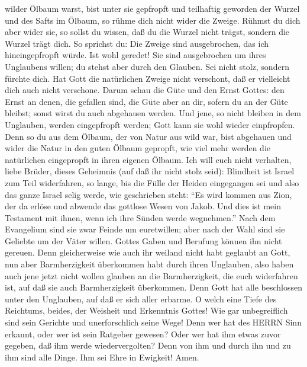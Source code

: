 wilder Ölbaum warst, bist unter sie gepfropft und teilhaftig geworden
der Wurzel und des Safts im Ölbaum,  so rühme dich nicht
wider die Zweige. Rühmst du dich aber wider sie, so sollst du wissen,
daß du die Wurzel nicht trägst, sondern die Wurzel trägt dich.
 So sprichst du: Die Zweige sind ausgebrochen, das ich
hineingepfropft würde.  Ist wohl geredet! Sie sind
ausgebrochen um ihres Unglaubens willen; du stehst aber durch den
Glauben. Sei nicht stolz, sondern fürchte dich.  Hat Gott
die natürlichen Zweige nicht verschont, daß er vielleicht dich auch
nicht verschone.  Darum schau die Güte und den Ernst
Gottes: den Ernst an denen, die gefallen sind, die Güte aber an dir,
sofern du an der Güte bleibst; sonst wirst du auch abgehauen werden.
 Und jene, so nicht bleiben in dem Unglauben, werden
eingepfropft werden; Gott kann sie wohl wieder einpfropfen.
 Denn so du aus dem Ölbaum, der von Natur aus wild war,
bist abgehauen und wider die Natur in den guten Ölbaum gepropft, wie
viel mehr werden die natürlichen eingepropft in ihren eigenen Ölbaum.
 Ich will euch nicht verhalten, liebe Brüder, dieses
Geheimnis (auf daß ihr nicht stolz seid): Blindheit ist Israel zum Teil
widerfahren, so lange, bis die Fülle der Heiden eingegangen sei
 und also das ganze Israel selig werde, wie geschrieben
steht: ``Es wird kommen aus Zion, der da erlöse und abwende das gottlose
Wesen von Jakob.  Und dies ist mein Testament mit ihnen,
wenn ich ihre Sünden werde wegnehmen.''  Nach dem
Evangelium sind sie zwar Feinde um euretwillen; aber nach der Wahl sind
sie Geliebte um der Väter willen.  Gottes Gaben und
Berufung können ihn nicht gereuen.  Denn gleicherweise wie
auch ihr weiland nicht habt geglaubt an Gott, nun aber Barmherzigkeit
überkommen habt durch ihren Unglauben,  also haben auch
jene jetzt nicht wollen glauben an die Barmherzigkeit, die euch
widerfahren ist, auf daß sie auch Barmherzigkeit überkommen.
 Denn Gott hat alle beschlossen unter den Unglauben, auf
daß er sich aller erbarme.  O welch eine Tiefe des
Reichtums, beides, der Weisheit und Erkenntnis Gottes! Wie gar
unbegreiflich sind sein Gerichte und unerforschlich seine Wege!
 Denn wer hat des HERRN Sinn erkannt, oder wer ist sein
Ratgeber gewesen?  Oder wer hat ihm etwas zuvor gegeben,
daß ihm werde wiedervergolten?  Denn von ihm und durch ihn
und zu ihm sind alle Dinge. Ihm sei Ehre in Ewigkeit! Amen.

